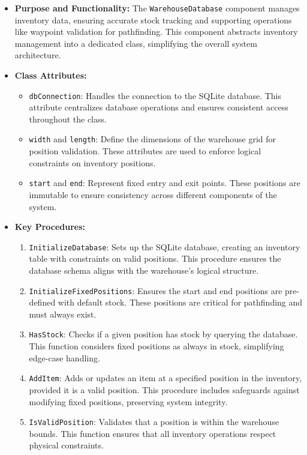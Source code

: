 \begin{itemize}
\item \textbf{Purpose and Functionality:}\newline
The \verb|WarehouseDatabase| component manages inventory data, ensuring accurate stock tracking and supporting operations like waypoint validation for pathfinding. This component abstracts inventory management into a dedicated class, simplifying the overall system architecture.

\item \textbf{Class Attributes:}
\begin{itemize}
    \item {\verb|dbConnection|:} Handles the connection to the SQLite database. This attribute centralizes database operations and ensures consistent access throughout the class.
    \item {\verb|width| and \verb|length|:} Define the dimensions of the warehouse grid for position validation. These attributes are used to enforce logical constraints on inventory positions.
    \item {\verb|start| and \verb|end|:} Represent fixed entry and exit points. These positions are immutable to ensure consistency across different components of the system.\newline
    
\end{itemize}

\item \textbf{Key Procedures:}
\begin{enumerate}
    \item {\verb|InitializeDatabase|:} Sets up the SQLite database, creating an inventory table with constraints on valid positions. This procedure ensures the database schema aligns with the warehouse's logical structure.
    \item {\verb|InitializeFixedPositions|:} Ensures the start and end positions are pre-defined with default stock. These positions are critical for pathfinding and must always exist.
    \item {\verb|HasStock|:} Checks if a given position has stock by querying the database. This function considers fixed positions as always in stock, simplifying edge-case handling.
    \item {\verb|AddItem|:} Adds or updates an item at a specified position in the inventory, provided it is a valid position. This procedure includes safeguards against modifying fixed positions, preserving system integrity.
    \item {\verb|IsValidPosition|:} Validates that a position is within the warehouse bounds. This function ensures that all inventory operations respect physical constraints.
\end{enumerate}


\end{itemize}
